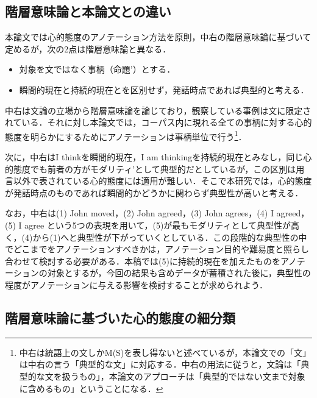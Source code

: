 \documentclass[japanese]{jnlp_1.4}
\begin{document}
\subsection{階層意味論と本論文との違い}

本論文では心的態度のアノテーション方法を原則，中右の階層意味論に基づいて定めるが，次の2点は階層意味論と異なる．
\begin{itemize}
\item 対象を文ではなく事柄（命題’）とする．
\item 瞬間的現在と持続的現在とを区別せず，発話時点であれば典型的と考える．
\end{itemize}
中右は文論の立場から階層意味論を論じており，観察している事例は文に限定されている．それに対し本論文では，コーパス内に現れる全ての事柄に対する心的態度を明らかにするためにアノテーションは事柄単位で行う\footnote{中右は統語上の文しかM(S)を表し得ないと述べているが，本論文での「文」は中右の言う「典型的な文」に対応する．中右の用法に従うと，文論は「典型的な文を扱うもの」，本論文のアプローチは「典型的ではない文まで対象に含めるもの」ということになる．}．

次に，中右はI thinkを瞬間的現在，I am thinkingを持続的現在とみなし，同じ心的態度でも前者の方がモダリティ’として典型的だとしているが，この区別は用言以外で表されている心的態度には適用が難しい．そこで本研究では，心的態度が発話時点のものであれば瞬間的かどうかに関わらず典型性が高いと考える．

なお，中右は(1) John moved，(2) John agreed，(3) John agrees，(4) I agreed，(5) I agree という5つの表現を用いて，(5)が最もモダリティとして典型性が高く，(4)から(1)へと典型性が下がっていくとしている．この段階的な典型性の中でどこまでをアノテーションすべきかは，アノテーション目的や難易度と照らし合わせて検討する必要がある．本稿では(5)に持続的現在を加えたものをアノテーションの対象とするが，今回の結果も含めデータが蓄積された後に，典型性の程度がアノテーションに与える影響を検討することが求められよう．

\subsection{階層意味論に基づいた心的態度の細分類}
\end{document}
